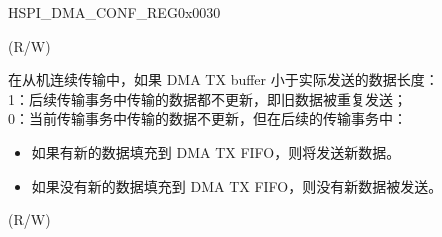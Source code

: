 \begin{register}{H}{SPI\_DMA\_CONF\_REG}{0x0030}
\begin{regdesc}
\begin{reglist}
(R/W)
\label{fielddesc:SPISLVTXSEGTRANSCLREN}\item [SPI\_SLV\_TX\_SEG\_TRANS\_CLR\_EN] 在从机连续传输中，如果 DMA TX buffer 小于实际发送的数据长度：\\
1：后续传输事务中传输的数据都不更新，即旧数据被重复发送； \\
0：当前传输事务中传输的数据不更新，但在后续的传输事务中：
            \begin{itemize}
            \item 如果有新的数据填充到 DMA TX FIFO，则将发送新数据。
            \item 如果没有新的数据填充到 DMA TX FIFO，则没有新数据被发送。
        \end{itemize}
(R/W)

\item [见下页...]
\end{reglist}\end{regdesc}
\end{register}

